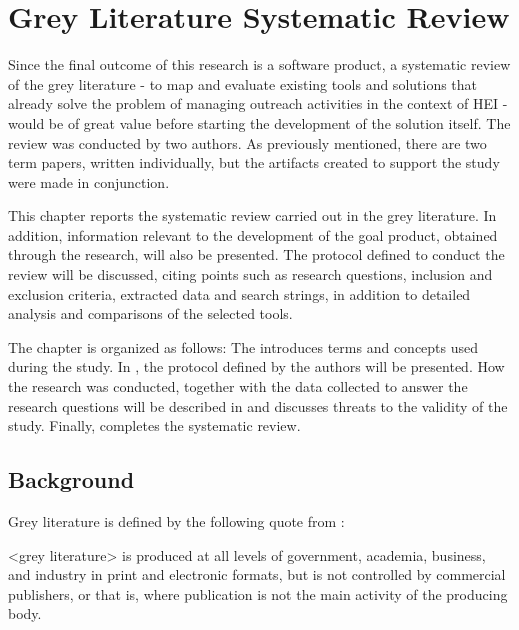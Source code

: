 \chapter{Grey Literature Systematic Review}\label{greyliterature}

Since the final outcome of this research is a software product, a systematic review of the grey literature - to map and evaluate existing tools and solutions that already solve the problem of managing outreach activities in the context of \ac{HEI} - would be of great value before starting the development of the solution itself. The review was conducted by two authors. As previously mentioned, there are two term papers, written individually, but the artifacts created to support the study were made in conjunction.

This chapter reports the systematic review carried out in the grey literature. In addition, information relevant to the development of the goal product, obtained through the research, will also be presented. The protocol defined to conduct the review will be discussed, citing points such as research questions, inclusion and exclusion criteria, extracted data and search strings, in addition to detailed analysis and comparisons of the selected tools.

The chapter is organized as follows: The  introduces terms and concepts used during the study. In , the protocol defined by the authors will be presented. How the research was conducted, together with the data collected to answer the research questions will be described in  and  discusses threats to the validity of the study. Finally,  completes the systematic review.

\section{Background}\label{sec:gl-background}

Grey literature is defined by the following quote from :
\begin{citacao}
  <grey literature> is produced at all levels of government, academia, business, and industry in print and electronic formats, but is not controlled by commercial publishers, or that is, where publication is not the main activity of the producing body.
\end{citacao}

